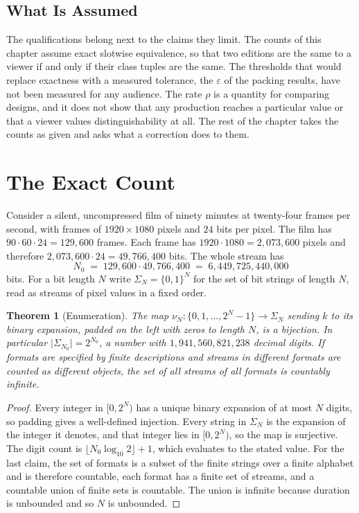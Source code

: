 \documentclass[11pt,twoside,openright]{book}
\theoremstyle{plain}
\newtheorem{theorem}{Theorem}[chapter]
\theoremstyle{definition}
\theoremstyle{remark}
\begin{document}
\subsection{What Is Assumed}

The qualifications belong next to the claims they limit. The counts of this chapter assume exact slotwise equivalence, so that two editions are the same to a viewer if and only if their class tuples are the same. The thresholds that would replace exactness with a measured tolerance, the $\varepsilon$ of the packing results, have not been measured for any audience. The rate $\rho$ is a quantity for comparing designs, and it does not show that any production reaches a particular value or that a viewer values distinguishability at all. The rest of the chapter takes the counts as given and asks what a correction does to them.

\section{The Exact Count}\label{sec:count}

Consider a silent, uncompressed film of ninety minutes at twenty-four frames per second, with frames of $1920\times1080$ pixels and $24$ bits per pixel. The film has $90\cdot60\cdot24=129{,}600$ frames. Each frame has $1920\cdot1080=2{,}073{,}600$ pixels and therefore $2{,}073{,}600\cdot24=49{,}766{,}400$ bits. The whole stream has
\[
N_0 \;=\; 129{,}600\cdot 49{,}766{,}400 \;=\; 6{,}449{,}725{,}440{,}000
\]
bits. For a bit length $N$ write $\Sigma_N=\{0,1\}^N$ for the set of bit strings of length $N$, read as streams of pixel values in a fixed order.

\begin{theorem}[Enumeration]\label{thm:enum}
The map $\nu_N:\{0,1,\dots,2^N-1\}\to\Sigma_N$ sending $k$ to its binary expansion, padded on the left with zeros to length $N$, is a bijection. In particular $\lvert\Sigma_{N_0}\rvert=2^{N_0}$, a number with $1{,}941{,}560{,}821{,}238$ decimal digits. If formats are specified by finite descriptions and streams in different formats are counted as different objects, the set of all streams of all formats is countably infinite.
\end{theorem}

\begin{proof}
Every integer in $[0,2^N)$ has a unique binary expansion of at most $N$ digits, so padding gives a well-defined injection. Every string in $\Sigma_N$ is the expansion of the integer it denotes, and that integer lies in $[0,2^N)$, so the map is surjective. The digit count is $\lfloor N_0\log_{10}2\rfloor+1$, which evaluates to the stated value. For the last claim, the set of formats is a subset of the finite strings over a finite alphabet and is therefore countable, each format has a finite set of streams, and a countable union of finite sets is countable. The union is infinite because duration is unbounded and so $N$ is unbounded.
\end{proof}
\end{document}
